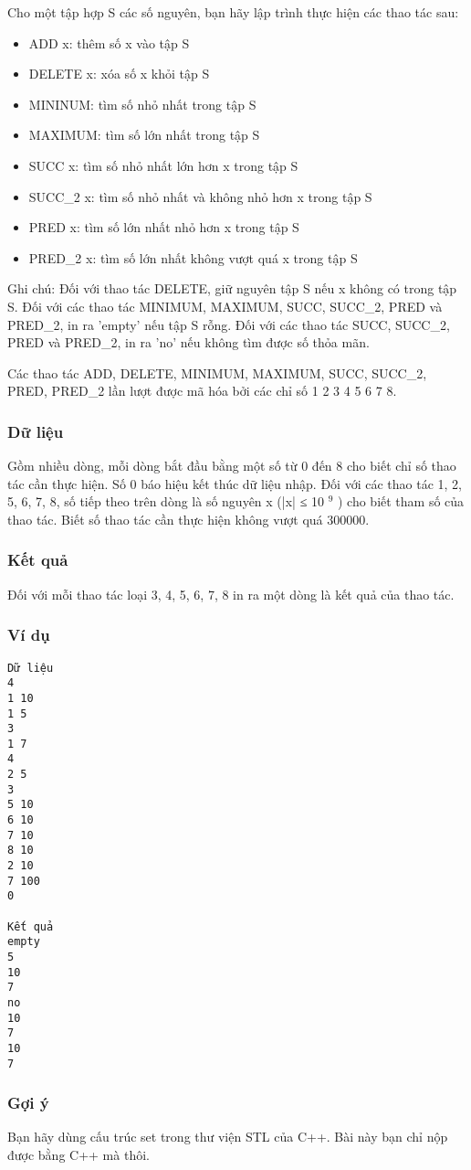 



   Cho một tập hợp S các số nguyên, bạn hãy lập trình thực hiện các thao tác sau:  
\begin{itemize}
	\item     ADD x: thêm số x vào tập S   
	\item     DELETE x: xóa số x khỏi tập S   
	\item     MININUM: tìm số nhỏ nhất trong tập S   
	\item     MAXIMUM: tìm số lớn nhất trong tập S   
	\item     SUCC x: tìm số nhỏ nhất lớn hơn x trong tập S   
	\item     SUCC\_2 x: tìm số nhỏ nhất và không nhỏ hơn x trong tập S   
	\item     PRED x: tìm số lớn nhất nhỏ hơn x trong tập S   
	\item     PRED\_2 x: tìm số lớn nhất không vượt quá x trong tập S   
\end{itemize}

   Ghi chú: Đối với thao tác DELETE, giữ nguyên tập S nếu x không có trong tập S. Đối với các thao tác MINIMUM, MAXIMUM, SUCC, SUCC\_2, PRED và PRED\_2, in ra 'empty' nếu tập S rỗng. Đối với các thao tác SUCC, SUCC\_2, PRED và PRED\_2, in ra 'no' nếu không tìm được số thỏa mãn.  

   Các thao tác ADD, DELETE, MINIMUM, MAXIMUM, SUCC, SUCC\_2, PRED, PRED\_2 lần lượt được mã hóa bởi các chỉ số 1 2 3 4 5 6 7 8.  

\subsubsection{   Dữ liệu  }

   Gồm nhiều dòng, mỗi dòng bắt đầu bằng một số từ 0 đến 8 cho biết chỉ số thao tác cần thực hiện. Số 0 báo hiệu kết thúc dữ liệu nhập. Đối với các thao tác 1, 2, 5, 6, 7, 8, số tiếp theo trên dòng là số nguyên x (|x| ≤ 10   $^    9   $   ) cho biết tham số của thao tác. Biết số thao tác cần thực hiện không vượt quá 300000.  

\subsubsection{   Kết quả  }

   Đối với mỗi thao tác loại 3, 4, 5, 6, 7, 8 in ra một dòng là kết quả của thao tác.  

\subsubsection{   Ví dụ  }
\begin{verbatim}
Dữ liệu
4
1 10
1 5
3
1 7
4
2 5
3
5 10
6 10
7 10
8 10
2 10
7 100
0

Kết quả
empty
5
10
7
no
10
7
10
7
\end{verbatim}

\subsubsection{   Gợi ý  }

   Bạn hãy dùng cấu trúc set trong thư viện STL của C++. Bài này bạn chỉ nộp được bằng C++ mà thôi.  